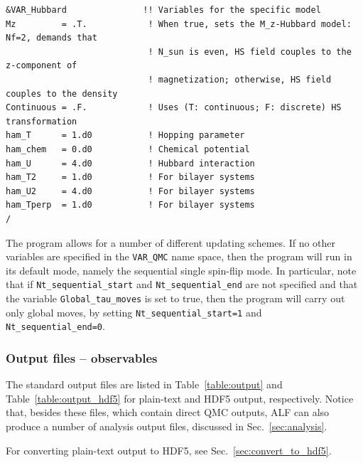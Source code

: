 \begin{lstlisting}[style=fortran,escapechar=\#,breaklines=true]
&VAR_Hubbard               !! Variables for the specific model
Mz         = .T.            ! When true, sets the M_z-Hubbard model: Nf=2, demands that
                            ! N_sun is even, HS field couples to the z-component of
                            ! magnetization; otherwise, HS field couples to the density
Continuous = .F.            ! Uses (T: continuous; F: discrete) HS transformation
ham_T      = 1.d0           ! Hopping parameter
ham_chem   = 0.d0           ! Chemical potential
ham_U      = 4.d0           ! Hubbard interaction
ham_T2     = 1.d0           ! For bilayer systems
ham_U2     = 4.d0           ! For bilayer systems
ham_Tperp  = 1.d0           ! For bilayer systems
/
\end{lstlisting}
%
\FloatBarrier

The program allows for a number of different  updating schemes.  If no other variables are specified in the \texttt{VAR\_QMC} name space, then the program will run in its default mode, namely the sequential single spin-flip mode.
In particular, note that if \texttt{Nt\_sequential\_start}  and \texttt{Nt\_sequential\_end}  are not specified and that the variable \texttt{Global\_tau\_moves}  is set to true, then  the program will  carry out only global moves, by setting \texttt{Nt\_sequential\_start=1}  and \texttt{Nt\_sequential\_end=0}. 



\subsubsection{Output files -- observables} \label{sec:output_obs}
%
The standard output files are listed in Table~\ref{table:output} and Table~\ref{table:output_hdf5} for plain-text and HDF5 output, respectively. Notice that, besides these files, which contain direct QMC outputs, ALF can also produce a number of analysis output files, discussed in Sec.~\ref{sec:analysis}.

For converting plain-text output to HDF5, see Sec.~\ref{sec:convert_to_hdf5}.


